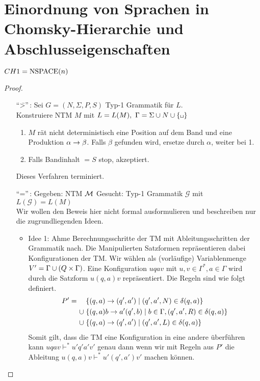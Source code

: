 \newpage

\section{Einordnung von Sprachen in Chomsky-Hierarchie und Abschlusseigenschaften}



\begin{Satz}\label{satz:6.3}
	$CH{1}=\operatorname{NSPACE}(n)$
\end{Satz}
\begin{proof}\
\begin{itemize}
	\item["`\=>"'\,:] Sei $G=(N,\Sigma,P,S)$ Typ-1 Grammatik für $L$.\\
		Konstruiere \ac{NTM} $M$ mit $L=L(M),\ \Gamma = \Sigma\cup N\cup\{\blank\}$
		\begin{enumerate}
		\item $M$ rät nicht deterministisch eine Position auf
                  dem Band und eine Produktion $\alpha\-> \beta$. Falls $\beta$ gefunden wird, ersetze durch $\alpha$, weiter bei 1.
		\item Falls Bandinhalt $=S$ \quad stop, akzeptiert.
		\end{enumerate}
		Dieses Verfahren terminiert.
	\item["`\<="'\,:] %
	Gegeben: \ac{NTM} $\mathcal{M}$ 
	Gesucht: Typ-1 Grammatik $\mathcal{G}$ mit $L(\mathcal{G})=L(M)$\\
	Wir wollen den Beweis hier nicht formal ausformulieren und beschreiben nur die zugrundliegenden Ideen.
	\begin{itemize}
	\item Idee 1:
	Ahme Berechnungsschritte der \ac{TM} mit Ableitungsschritten der Grammatik nach.
	Die Manipulierten Satzformen repräsentieren dabei Konfigurationen der TM.
	Wir wählen als (vorläufige) Variablenmenge $V'=\Gamma\cup(Q\times\Gamma)$.
	Eine Konfiguration $uqav$ mit $u,v\in\Gamma^*,a\in\Gamma$ wird durch die Satzform $u(q,a)v$ repräsentiert.
	Die Regeln sind wie folgt definiert.
	\begin{align*}
	 P' = \quad &\; \{ (q,a) \-> (q',a') \mid (q',a',N)\in \delta(q,a)\}\\
	 \cup &\; \{ (q,a)b \-> a'(q',b) \mid b\in\Gamma, (q',a',R)\in \delta(q,a) \}\\
	 \cup &\; \{ (q,a) \-> (q',a') \mid (q',a',L)\in \delta(q,a)\}
	\end{align*}
    Somit gilt, dass die \ac{TM} eine Konfiguration in eine andere überführen kann $uqav \vdash^{*} u'q'a'v'$
    genau dann wenn wir mit Regeln aus $P'$ die Ableitung $u(q,a)v \vdash^{*} u'(q',a')v'$ machen können.


\end{itemize}
\end{itemize}
\end{proof}
